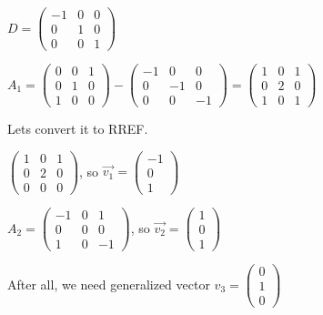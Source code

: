 \documentclass[12pt,letterpaper]{article}
\begin{document}
$D = \begin{pmatrix}
            -1 & 0 & 0 \\
            0 & 1 & 0 \\
            0 & 0 & 1
        \end{pmatrix}$
        
$A_1 = \begin{pmatrix}
            0 & 0 & 1 \\
            0 & 1 & 0 \\
            1 & 0 & 0
        \end{pmatrix} - \begin{pmatrix}
            -1 & 0 & 0 \\
            0 & -1 & 0 \\
            0 & 0 & -1
        \end{pmatrix} = \begin{pmatrix}
            1 & 0 & 1 \\
            0 & 2 & 0 \\
            1 & 0 & 1
        \end{pmatrix}$

Lets convert it to RREF.

$\begin{pmatrix}
            1 & 0 & 1 \\
            0 & 2 & 0 \\
            0 & 0 & 0
        \end{pmatrix}$, so $\vec{v_1} = \begin{pmatrix}
            -1 \\
            0 \\
            1
        \end{pmatrix}$
        
$A_2 = \begin{pmatrix}
            -1 & 0 & 1 \\
            0 & 0 & 0 \\
            1 & 0 & -1
        \end{pmatrix}$, so $\vec{v_2} = \begin{pmatrix}
            1 \\
            0 \\
            1
        \end{pmatrix}$
        
After all, we need generalized vector $v_3 = \begin{pmatrix}
            0 \\
            1 \\
            0
        \end{pmatrix}$
        
\end{document}
